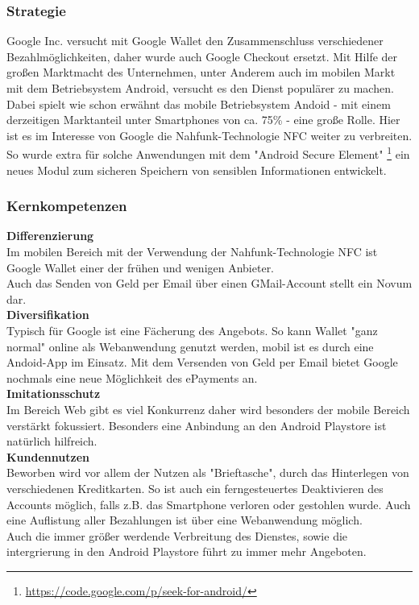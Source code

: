 	
\subsubsection{Strategie}
Google Inc. versucht mit Google Wallet den Zusammenschluss verschiedener Bezahlmöglichkeiten, daher wurde auch Google Checkout ersetzt.
Mit Hilfe der großen Marktmacht des Unternehmen, unter Anderem auch im mobilen Markt mit dem Betriebsystem Android, versucht es den Dienst populärer zu machen. Dabei spielt wie schon erwähnt das mobile Betriebsystem Andoid - mit einem derzeitigen Marktanteil unter Smartphones von ca. 75\% - eine große Rolle. Hier ist es im Interesse von Google die Nahfunk-Technologie NFC weiter zu verbreiten. So wurde extra für solche Anwendungen mit dem "Android Secure Element" \footnote{\url{https://code.google.com/p/seek-for-android/}} ein neues Modul zum sicheren Speichern von sensiblen Informationen entwickelt.


\subsubsection{Kernkompetenzen}
\textbf{Differenzierung}\\
Im mobilen Bereich mit der Verwendung der Nahfunk-Technologie NFC ist Google Wallet einer der frühen und wenigen Anbieter.\\
Auch das Senden von Geld per Email über einen GMail-Account stellt ein Novum dar.\\

\textbf{Diversifikation}\\
Typisch für Google ist eine Fächerung des Angebots. So kann Wallet "ganz normal" online als Webanwendung genutzt werden, mobil ist es durch eine Andoid-App im Einsatz. Mit dem Versenden von Geld per Email bietet Google nochmals eine neue Möglichkeit des ePayments an.\\

\textbf{Imitationsschutz}\\
Im Bereich Web gibt es viel Konkurrenz daher wird besonders der mobile Bereich verstärkt fokussiert. Besonders eine Anbindung an den Android Playstore ist natürlich hilfreich.\\

\textbf{Kundennutzen}\\
Beworben wird vor allem der Nutzen als "Brieftasche", durch das Hinterlegen von verschiedenen Kreditkarten. So ist auch ein ferngesteuertes Deaktivieren des Accounts möglich, falls z.B. das Smartphone verloren oder gestohlen wurde. Auch eine Auflistung aller Bezahlungen ist über eine Webanwendung möglich.\\
Auch die immer größer werdende Verbreitung des Dienstes, sowie die intergrierung in den Android Playstore führt zu immer mehr Angeboten.\\

